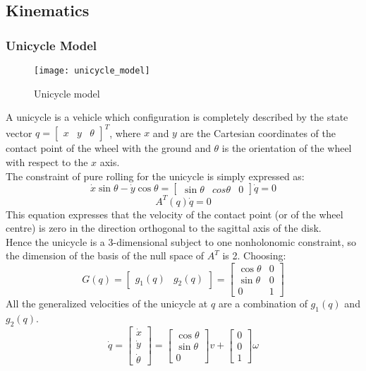 \subsection{Kinematics}
\subsubsection{Unicycle Model}
\begin{figure}[h!]
	\centering
	\texttt{[image: unicycle\_model]}
	\caption{Unicycle model}
\end{figure}
A unicycle is a vehicle which configuration is completely described by the state vector $q = \left[\begin{matrix}x&y&\theta\end{matrix}\right]^T$, where $x$ and $y$ are the Cartesian coordinates of the contact point of the wheel with the ground and $\theta$ is the orientation of the wheel with respect to the $x$ axis. \\
The constraint of pure rolling for the unicycle is simply expressed as:
\begin{equation} 
\dot{x}\sin\theta-\dot{y}\cos\theta=\left[
\begin{matrix}
\sin\theta & cos\theta & 0
\end{matrix}
\right] \dot{q}=0
\end{equation}
\begin{equation*} \label{At}
A^T \left( q \right)\dot{q} =0  
\end{equation*}
This equation expresses that the velocity of the contact point (or of the wheel centre) is zero in the direction orthogonal to the sagittal axis of the disk.\\
Hence the unicycle is a 3-dimensional subject to one nonholonomic constraint, so the dimension of the basis of the null space of $A^T$ is 2. Choosing:
\begin{equation} \label{Gmatrix_def}
G(q)=\left[
\begin{matrix}
g_1 (q) & g_2 (q)
\end{matrix}
\right] =  \left[
\begin{matrix}
\cos\theta & 0 \\
\sin\theta & 0 \\
0 & 1 
\end{matrix}
\right] 
\end{equation}
All the generalized velocities of the unicycle at $q$ are a combination of $g_1 (q)$ and $g_2 (q)$.
\begin{equation} 
\dot{q}=\left[
\begin{matrix}
\dot{x} \\ \dot{y} \\\dot{\theta}
\end{matrix}
\right] =  \left[
\begin{matrix}
\cos\theta \\ \sin\theta \\ 0 
\end{matrix}
\right]v + \left[
\begin{matrix}
0 \\ 0 \\ 1 
\end{matrix}
\right]\omega
\end{equation}
